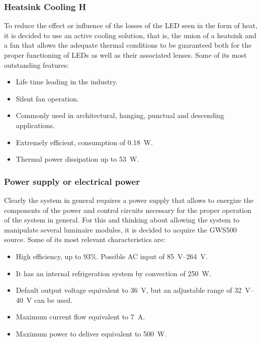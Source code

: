 \documentclass[letterpaper,12pt,twoside]{articleingud}
\begin{document}
\subsubsection{Heatsink Cooling H}
To reduce the effect or influence of the losses of the LED seen in the form of heat, it is decided to use an active cooling solution, that is, the union of a heatsink and a fan that allows the adequate thermal conditions to be guaranteed both for the proper functioning of LEDs as well as their associated lenses. Some of its most outstanding features:\cite{disipador} 
\begin{itemize}
    \item Life time leading in the industry.
    \item Silent fan operation.
    \item Commonly used in architectural, hanging, punctual and descending applications.
    \item Extremely efficient, consumption of \SI{0.18}{\watt}.
    \item Thermal power dissipation up to \SI{53}{\watt}.
\end{itemize}

\subsubsection{Power supply or electrical power}
Clearly the system in general requires a power supply that allows to energize the components of the power and control circuits necessary for the proper operation of the system in general. For this and thinking about allowing the system to manipulate several luminaire modules, it is decided to acquire the GWS500 source. Some of its most relevant characteristics are:\cite{fuenteDC}
\begin{itemize}
    \item High efficiency, up to $93\%$. Possible AC input of \SIrange{85}{264}{\volt}.
    \item It has an internal refrigeration system by convection of \SI{250}{\watt}.
    \item Default output voltage equivalent to \SI{36}{\volt}, but an adjustable range of \SIrange{32}{40}{\volt} can be used.
    \item Maximum current flow equivalent to \SI{7}{\ampere}.
    \item Maximum power to deliver equivalent to \SI{500}{\watt}.
\end{itemize}
\end{document}
